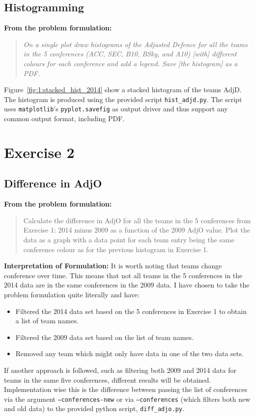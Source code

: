 \documentclass[
    12pt,
    a4paper,
    oneside, 
    headinclude,footinclude,
    BCOR5mm,
]{scrartcl}
\newcommand{\cmd}[1]{\texttt{#1}}
\newcommand{\exercisequote}[1]{%
    {\quad\bfseries \small From the problem formulation:}%
    \vspace{-.5em}%
    \begin{quote}\itshape %
        #1 %
    \end{quote}%
}
\begin{document}
\subsection*{Histogramming}
\exercisequote{%
    On a single plot draw histograms of 
    the Adjusted Defence for all the teams in the 5 conferences 
    (ACC, SEC, B10, BSky, and A10)
    [with] different colours for each conference and add a legend.
    Save [the histogram] as a PDF.
}

Figure~\ref{fig:1:stacked_hist_2014} show a stacked histogram of the teams AdjD.
The histogram is produced using the provided script \cmd{hist\_adjd.py}.
The script uses \cmd{matplotlib}'s \cmd{pyplot.savefig} as output driver
and thus support any common output format,
including PDF.

\section*{Exercise 2}
\subsection*{Difference in AdjO}
\exercisequote{
    Calculate the difference in AdjO for all the teams in the 5 
    conferences from Exercise 1:
    2014 minus 2009 as a function of the 2009 AdjO value.
    Plot the data as a graph with a data point for each team entry being 
    the same conference colour as for the previous histogram in Exercise 1.
}

\textbf{Interpretation of Formulation:}
It is worth noting that teams change conference over time.
This means that not all teams in the 5 conferences in the 2014 data are in the same conferences
in the 2009 data.
I have chosen to take the problem formulation quite literally and have:
\begin{itemize}
    \item Filtered the 2014 data set based on the 5 conferences in Exercise 1 to obtain a list of team names.
    \item Filtered the 2009 data set based on the list of team names.
    \item Removed any team which might only have data in one of the two data sets.
\end{itemize}
If another approach is followed, such as filtering both 2009 and 2014 data for teams in the same five conferences,
different results will be obtained.
Implementation wise this is the difference between passing the list of conferences via the argument
\cmd{--conferences-new} or via \cmd{--conferences} (which filters both new and old data)
to the provided python script, \cmd{diff\_adjo.py}.\\
\end{document}
